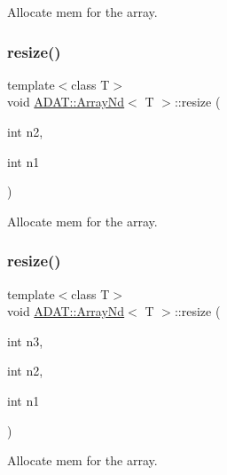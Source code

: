 Allocate mem for the array. 

\mbox{\label{classADAT_1_1ArrayNd_ac66a29c373d99ae8ead2344c1024489e}} 
\subsubsection{\texorpdfstring{resize()}{resize()}\hspace{0.1cm}{\footnotesize\ttfamily [9/15]}}
{\footnotesize\ttfamily template$<$class T$>$ \\
void \mbox{\hyperlink{classADAT_1_1ArrayNd}{A\+D\+A\+T\+::\+Array\+Nd}}$<$ T $>$\+::resize (\begin{DoxyParamCaption}\item[{int}]{n2,  }\item[{int}]{n1 }\end{DoxyParamCaption})\hspace{0.3cm}{\ttfamily [inline]}}



Allocate mem for the array. 

\mbox{\label{classADAT_1_1ArrayNd_a1b042ead88dae6696d7a0c77fd01ddfa}} 
\subsubsection{\texorpdfstring{resize()}{resize()}\hspace{0.1cm}{\footnotesize\ttfamily [10/15]}}
{\footnotesize\ttfamily template$<$class T$>$ \\
void \mbox{\hyperlink{classADAT_1_1ArrayNd}{A\+D\+A\+T\+::\+Array\+Nd}}$<$ T $>$\+::resize (\begin{DoxyParamCaption}\item[{int}]{n3,  }\item[{int}]{n2,  }\item[{int}]{n1 }\end{DoxyParamCaption})\hspace{0.3cm}{\ttfamily [inline]}}



Allocate mem for the array. 

\mbox{\label{classADAT_1_1ArrayNd_a1b042ead88dae6696d7a0c77fd01ddfa}} 
